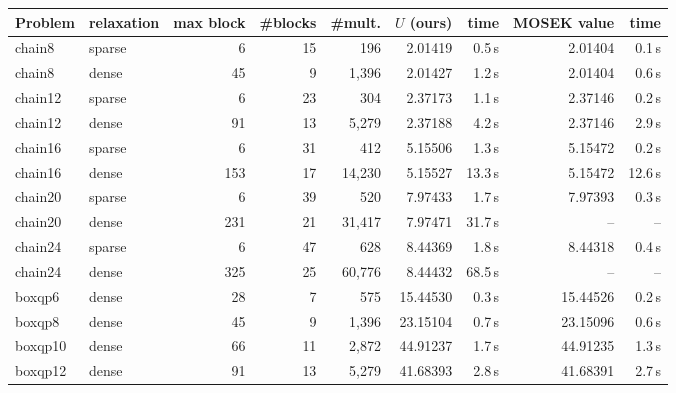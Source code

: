 \begin{tabular}{l l r r r r r r r}\toprule
Problem & relaxation & max block & \#blocks & \#mult. & $U$ (ours) & time & MOSEK value & time \\\midrule
chain8 & sparse & 6 & 15 & 196 & 2.01419 & 0.5\,s & 2.01404 & 0.1\,s \\
chain8 & dense & 45 & 9 & 1{,}396 & 2.01427 & 1.2\,s & 2.01404 & 0.6\,s \\
chain12 & sparse & 6 & 23 & 304 & 2.37173 & 1.1\,s & 2.37146 & 0.2\,s \\
chain12 & dense & 91 & 13 & 5{,}279 & 2.37188 & 4.2\,s & 2.37146 & 2.9\,s \\
chain16 & sparse & 6 & 31 & 412 & 5.15506 & 1.3\,s & 5.15472 & 0.2\,s \\
chain16 & dense & 153 & 17 & 14{,}230 & 5.15527 & 13.3\,s & 5.15472 & 12.6\,s \\
chain20 & sparse & 6 & 39 & 520 & 7.97433 & 1.7\,s & 7.97393 & 0.3\,s \\
chain20 & dense & 231 & 21 & 31{,}417 & 7.97471 & 31.7\,s & -- & -- \\
chain24 & sparse & 6 & 47 & 628 & 8.44369 & 1.8\,s & 8.44318 & 0.4\,s \\
chain24 & dense & 325 & 25 & 60{,}776 & 8.44432 & 68.5\,s & -- & -- \\
boxqp6 & dense & 28 & 7 & 575 & 15.44530 & 0.3\,s & 15.44526 & 0.2\,s \\
boxqp8 & dense & 45 & 9 & 1{,}396 & 23.15104 & 0.7\,s & 23.15096 & 0.6\,s \\
boxqp10 & dense & 66 & 11 & 2{,}872 & 44.91237 & 1.7\,s & 44.91235 & 1.3\,s \\
boxqp12 & dense & 91 & 13 & 5{,}279 & 41.68393 & 2.8\,s & 41.68391 & 2.7\,s \\
\bottomrule\end{tabular}
